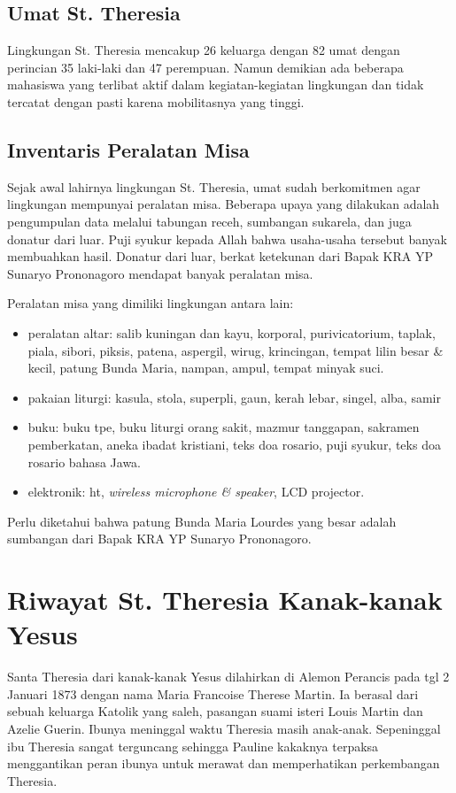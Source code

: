 \subsection*{Umat St. Theresia}
Lingkungan St. Theresia mencakup 26 keluarga dengan 82 umat dengan perincian 35 laki-laki dan 47 perempuan. Namun demikian ada beberapa mahasiswa yang terlibat aktif dalam kegiatan-kegiatan lingkungan dan tidak tercatat dengan pasti karena mobilitasnya yang tinggi.

\subsection*{Inventaris Peralatan Misa}
Sejak awal lahirnya lingkungan St. Theresia, umat sudah berkomitmen agar lingkungan mempunyai peralatan misa. Beberapa upaya yang dilakukan adalah pengumpulan data melalui tabungan receh, sumbangan sukarela, dan juga donatur dari luar. Puji syukur kepada Allah bahwa usaha-usaha tersebut banyak membuahkan hasil. Donatur dari luar, berkat ketekunan dari Bapak KRA YP Sunaryo Prononagoro mendapat banyak peralatan misa. 

Peralatan misa yang dimiliki lingkungan antara lain:
\begin{itemize}
\item peralatan altar: salib kuningan dan kayu,
korporal,
purivicatorium,
taplak,
piala,
sibori,
piksis,
patena,
aspergil,
wirug,
krincingan,
tempat lilin besar \& kecil,
patung Bunda Maria,
nampan, ampul,
tempat minyak suci.
\item pakaian liturgi: kasula,
stola,
superpli,
gaun,
kerah lebar,
singel,
alba,
samir
\item buku: buku tpe,
buku liturgi orang sakit,
mazmur tanggapan, sakramen pemberkatan,
aneka ibadat kristiani, teks doa rosario,
puji syukur, teks doa rosario bahasa Jawa.
\item elektronik: ht, \textit{wireless microphone \& speaker}, LCD projector.
\end{itemize} 

Perlu diketahui bahwa patung Bunda Maria Lourdes yang besar adalah sumbangan dari Bapak KRA YP Sunaryo Prononagoro.


\section{Riwayat St. Theresia Kanak-kanak Yesus}
Santa Theresia dari kanak-kanak Yesus dilahirkan di Alemon Perancis pada tgl 2 Januari 1873 dengan nama Maria Francoise Therese Martin. Ia berasal dari sebuah keluarga Katolik yang saleh, pasangan suami isteri Louis Martin dan Azelie Guerin. Ibunya meninggal waktu Theresia masih anak-anak. Sepeninggal ibu Theresia sangat terguncang sehingga Pauline kakaknya terpaksa menggantikan peran ibunya untuk merawat dan memperhatikan perkembangan Theresia.

